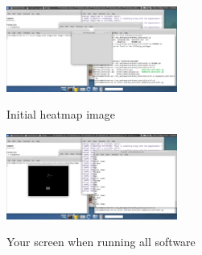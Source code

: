 \documentclass[a4paper,10pt]{article}
\begin{document}
\begin{figure}[h!]
	\caption{Initial heatmap image}
	\centering
	\includegraphics[width=0.5\textwidth]{images/heatmapterminal}
	\label{fig:heatmapterminal}
\end{figure}

\begin{figure}[h!]
	\caption{Your screen when running all software}
	\centering
	\includegraphics[width=0.5\textwidth]{images/totalpicture}
	\label{fig:totalpicture}
\end{figure}
\end{document}
